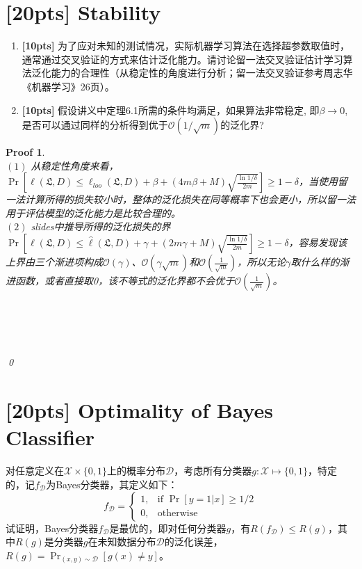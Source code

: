 \documentclass[a4paper,UTF8]{article}
\numberwithin{equation}{section}
\newtheorem*{myProof}{Proof}
\begin{document}
	\section{[20pts] Stability}
	\noindent
	
	\begin{enumerate}[ {(}1{)}]
		\item \textbf{[10pts]} 为了应对未知的测试情况，实际机器学习算法在选择超参数取值时，通常通过交叉验证的方式来估计泛化能力。请讨论留一法交叉验证估计学习算法泛化能力的合理性（从稳定性的角度进行分析；留一法交叉验证参考周志华《机器学习》26页）。
		\item \textbf{[10pts]} 假设讲义中定理6.1所需的条件均满足，如果算法非常稳定, 即$\beta\rightarrow 0$, 是否可以通过同样的分析得到优于$\mathcal{O}(1/\sqrt{m})$的泛化界?
	\end{enumerate}
	
	
	\begin{myProof}~\\
$(1)$ 从稳定性角度来看，$\Pr[ \ell(\mathfrak{L}, D) \le \ell_{loo} ( \mathfrak{L}, D) + \beta + (4m\beta + M) \sqrt{\frac{\ln 1 / \delta}{2m}} ] \ge 1 - \delta$，当使用留一法计算所得的损失较小时，整体的泛化损失在同等概率下也会更小，所以留一法用于评估模型的泛化能力是比较合理的。
~\\
$(2)$ slides中推导所得的泛化损失的界$\Pr[ \ell(\mathfrak{L}, D) \le \hat{\ell} ( \mathfrak{L}, D) + \gamma + (2m\gamma + M) \sqrt{\frac{\ln 1 / \delta}{2m}} ] \ge 1 - \delta$，容易发现该上界由三个渐进项构成$\mathcal{O}(\gamma)$、$\mathcal{O}(\gamma \sqrt{m})$和$\mathcal{O}({\frac{1}{\sqrt{m}}})$，所以无论$\gamma$取什么样的渐进函数，或者直接取0，该不等式的泛化界都不会优于$\mathcal{O}({\frac{1}{\sqrt{m}}})$。

		
		~\\
		~\\
		~\\
		~\\
		\qed
	\end{myProof}
	
	\newpage
	\section{[20pts] Optimality of Bayes Classifier}
	对任意定义在$\mathcal{X}\times\{0,1\}$上的概率分布$\mathcal{D}$，考虑所有分类器$g:\mathcal X \mapsto \{0,1\}$，特定的，记$f_{\mathcal{D}}$为Bayes分类器，其定义如下：
	\[
	f_{\mathcal{D}} = 
	\begin{cases}
	1,&\mbox{if }\Pr[y=1|x]\geq 1/2\\
	0,&\mbox{otherwise}
	\end{cases}
	\]
	试证明，Bayes分类器$f_{\mathcal D}$是最优的，即对任何分类器$g$，有$R(f_{\mathcal D}) \leq R(g)$，其中$R(g)$是分类器$g$在未知数据分布$\mathcal{D}$的泛化误差，$R(g) = \Pr_{(x,y) \sim \mathcal{D}}[g(x) \neq y]$。
	
\end{document}

